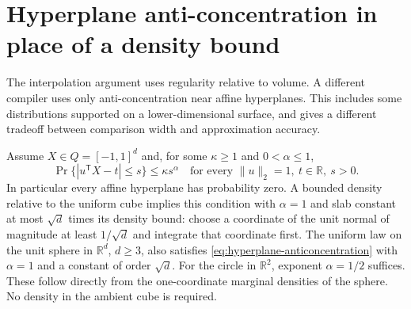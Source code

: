 \section{Hyperplane anti-concentration in place of a density bound}
\label{sec:hyperplane-regularity}
The interpolation argument uses regularity relative to volume. A different compiler uses only anti-concentration near affine hyperplanes. This includes some distributions supported on a lower-dimensional surface, and gives a different tradeoff between comparison width and approximation accuracy.

Assume $X\in Q=[-1,1]^d$ and, for some $\kappa\ge1$ and $0<\alpha\le1$,
\begin{equation}
 \Pr\{|u^{\mathsf T}X-t|\le s\}\le\kappa s^\alpha
 \quad\text{for every }\|u\|_2=1,\ t\in\mathbb R,\ s>0.
 \label{eq:hyperplane-anticoncentration}
\end{equation}
In particular every affine hyperplane has probability zero. A bounded density relative to the uniform cube implies this condition with $\alpha=1$ and slab constant at most $\sqrt d$ times its density bound: choose a coordinate of the unit normal of magnitude at least $1/\sqrt d$ and integrate that coordinate first. The uniform law on the unit sphere in $\mathbb R^d$, $d\ge3$, also satisfies \eqref{eq:hyperplane-anticoncentration} with $\alpha=1$ and a constant of order $\sqrt d$. For the circle in $\mathbb R^2$, exponent $\alpha=1/2$ suffices. These follow directly from the one-coordinate marginal densities of the sphere. No density in the ambient cube is required.

